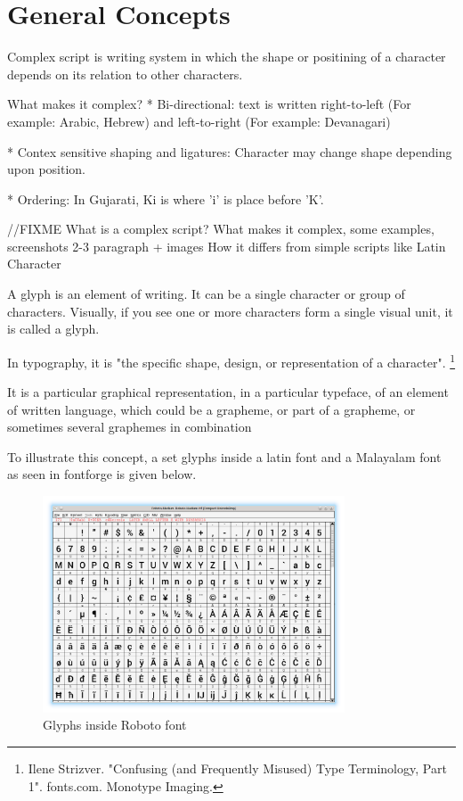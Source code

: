 \chapter{General Concepts}


Complex script is writing system in which the shape or positining of a character
depends on its relation to other characters.

What makes it complex?
* Bi-directional: text is written right-to-left (For example: Arabic, Hebrew)
and left-to-right (For example: Devanagari)

* Contex sensitive shaping and ligatures: Character may change shape depending
upon position.

* Ordering:
In Gujarati, Ki is where 'i' is place before 'K'.

//FIXME
What is a complex script? What makes it complex, some examples, screenshots
2-3 paragraph + images
How it differs from simple scripts like Latin Character


A glyph is an element of writing. It can be a single character or group of characters. 
Visually, if you see one or more characters form a single visual unit, it is called a glyph.

In typography, it is "the specific shape, design, or representation of a character".
\footnote{Ilene Strizver. "Confusing (and Frequently Misused) Type Terminology, Part 1". fonts.com. Monotype Imaging.}

It is a particular graphical representation, in a particular typeface, of an element of written language, which could be a grapheme, or part of a grapheme, or sometimes several graphemes in combination 
 
To illustrate this concept, a set glyphs inside a latin font and a Malayalam font as seen in fontforge is given below.

\begin{figure}[h]
    \centering
    \includegraphics[width=0.8\textwidth]{glyph-fontforge-roboto.png}
    \caption{Glyphs inside Roboto font}
\end{figure}

